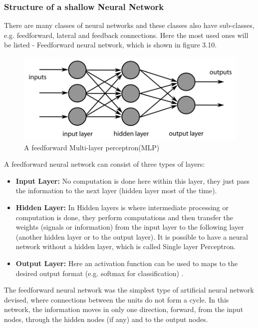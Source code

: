 \subsubsection*{Structure of a shallow Neural Network}
There are many classes of neural networks and these classes also have sub-classes, e.g. feedforward, lateral and feedback connections. Here the most used ones will be listed - Feedforward neural network, which is shown in figure 3.10.

\begin{figure}[h]
	\includegraphics[width=\textwidth]{Figures/Section3_FeedforwardNN.png} 
	\captionsetup{justification=centering}
	\caption{A feedforward Multi-layer perceptron(MLP)}
	\label{fig:MLP}
\end{figure}

A feedforward neural network can consist of three types of layers:

\begin{itemize}
	\item \textbf{Input Layer:} No computation is done here within this layer, they just pass the information to the next layer (hidden layer most of the time).
	\item \textbf{Hidden Layer:} In Hidden layers is where intermediate processing or computation is done, they perform computations and then transfer the weights (signals or information) from the input layer to the following layer (another hidden layer or to the output layer). It is possible to have a neural network without a hidden layer, which is called Single layer Perceptron.
	\item \textbf{Output Layer:} Here an activation function can be used to maps to the desired output format (e.g. softmax for classification) .
\end{itemize}

The feedforward neural network was the simplest type of artificial neural network devised, where connections between the units do not form a cycle. In this network, the information moves in only one direction, forward, from the input nodes, through the hidden nodes (if any) and to the output nodes. 

